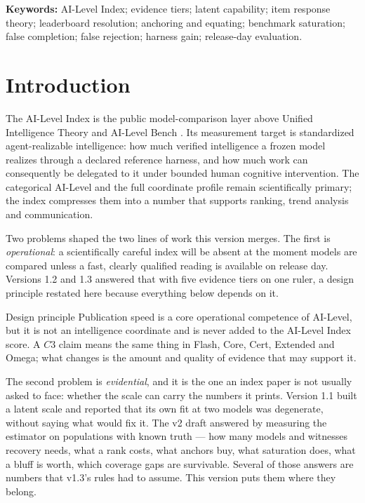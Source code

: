 \noindent\textbf{Keywords:} AI-Level Index; evidence tiers; latent capability; item response theory; leaderboard resolution; anchoring and equating; benchmark saturation; false completion; false rejection; harness gain; release-day evaluation.

\tableofcontents
\bigskip

\section{Introduction}\label{sec:intro}

The AI-Level Index is the public model-comparison layer above Unified Intelligence Theory \citep{yang2026unified} and AI-Level Bench \citep{yang2026hilbench,yang2026hilbenchpaper}. Its measurement target is standardized agent-realizable intelligence: how much verified intelligence a frozen model realizes through a declared reference harness, and how much work can consequently be delegated to it under bounded human cognitive intervention. The categorical AI-Level and the full coordinate profile remain scientifically primary; the index compresses them into a number that supports ranking, trend analysis and communication.

Two problems shaped the two lines of work this version merges. The first is \emph{operational}: a scientifically careful index will be absent at the moment models are compared unless a fast, clearly qualified reading is available on release day. Versions 1.2 and 1.3 answered that with five evidence tiers on one ruler, a design principle restated here because everything below depends on it.

\begin{claimbox}{Design principle}
Publication speed is a core operational competence of AI-Level, but it is not an intelligence coordinate and is never added to the AI-Level Index score. A $C3$ claim means the same thing in Flash, Core, Cert, Extended and Omega; what changes is the amount and quality of evidence that may support it.
\end{claimbox}

The second problem is \emph{evidential}, and it is the one an index paper is not usually asked to face: whether the scale can carry the numbers it prints. Version 1.1 built a latent scale and reported that its own fit at two models was degenerate, without saying what would fix it. The v2 draft answered by measuring the estimator on populations with known truth --- how many models and witnesses recovery needs, what a rank costs, what anchors buy, what saturation does, what a bluff is worth, which coverage gaps are survivable. Several of those answers are numbers that v1.3's rules had to assume. This version puts them where they belong.

